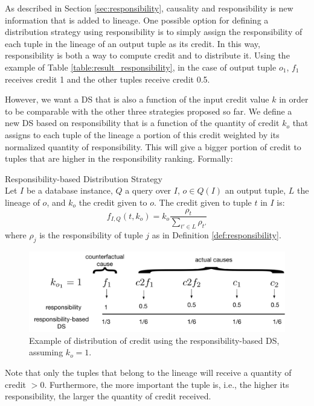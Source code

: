 As described in Section \ref{sec:responsibility}, causality and responsibility is 
new information that is added to lineage.   One possible option for defining a distribution strategy using responsibility is to simply assign the responsibility of each tuple in the lineage of an output tuple as its credit. In this way, responsibility is both a way to compute credit and to distribute it.
Using the example of Table \ref{table:result_responsibility}, in the case of output tuple $o_1$, $f_1$ receives credit 1 and the other tuples receive credit 0.5.


However, we want a DS that is also a function of the input credit value $k$ in order to be comparable with the other three strategies proposed so far.
We define a new DS based on responsibility that is a function of the quantity of credit $k_o$ that assigns to each tuple of the lineage a portion of this credit weighted by its normalized quantity of responsibility.
This will give a bigger portion of credit to tuples that are higher in the responsibility ranking.
Formally:
\newline
\begin{definition}{Responsibility-based Distribution Strategy}\\
\label{def:resp_ds}
Let $I$ be a database instance, $Q$ a query over $I$, $o \in Q(I)$ an output tuple, $L$ the lineage of $o$, and $k_o$ the credit given to $o$. The credit given to tuple $t$ in $I$ is:
\[
	f_{I, Q}(t, k_o) = k_o \frac{\rho_t}{\sum_{t' \in L} \rho_{t'}}
\]
where $\rho_j$ is the responsibility of tuple $j$ as in Definition \ref{def:responsibility}.
\end{definition}


\begin{figure}[]
\centering
  \includegraphics[width=.7\textwidth]{figures/resp_example}
  \caption{Example of distribution of credit using 
    the responsibility-based DS, assuming $k_o = 1$.}
  \label{fig:resp_example}
\end{figure}

Note that only the tuples that belong to the lineage will receive a quantity of credit $> 0$. Furthermore, the more important the tuple is, i.e., the higher its responsibility, the larger the quantity of credit received. 

